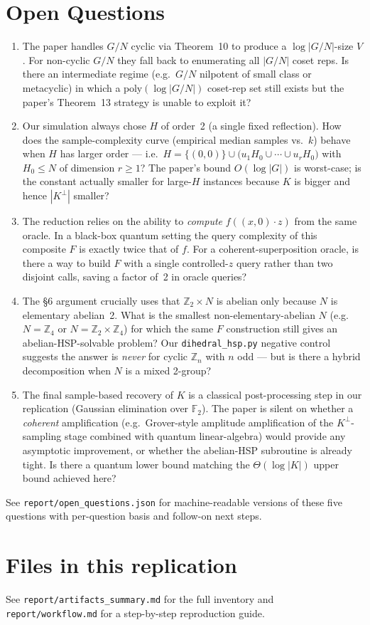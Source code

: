 \documentclass[11pt]{article}
\begin{document}
\section{Open Questions}
\begin{enumerate}
  \item[Q1.] The paper handles $G/N$ cyclic via Theorem~10 to
        produce a $\log|G/N|$-size $V$.  For non-cyclic $G/N$ they
        fall back to enumerating all $|G/N|$ coset reps.  Is there
        an intermediate regime (e.g.\ $G/N$ nilpotent of small class
        or metacyclic) in which a $\mathrm{poly}(\log|G/N|)$
        coset-rep set still exists but the paper's Theorem~13
        strategy is unable to exploit it?
  \item[Q2.] Our simulation always chose $H$ of order~2 (a single fixed
        reflection).  How does the sample-complexity curve
        (empirical median samples vs.\ $k$) behave when $H$ has larger
        order — i.e.\ $H=\{(0,0)\}\cup\bigl(u_1H_0\cup\cdots\cup u_r H_0\bigr)$
        with $H_0\le N$ of dimension $r\ge 1$?  The paper's bound
        $O(\log|G|)$ is worst-case; is the constant actually smaller
        for large-$H$ instances because $K$ is bigger and hence
        $|K^\perp|$ smaller?
  \item[Q3.] The reduction relies on the ability to \emph{compute}
        $f((x,0)\cdot z)$ from the same oracle. In a black-box quantum
        setting the query complexity of this composite $F$ is exactly
        twice that of $f$.  For a coherent-superposition oracle, is
        there a way to build $F$ with a single controlled-$z$ query
        rather than two disjoint calls, saving a factor of~2 in
        oracle queries?
  \item[Q4.] The \S6 argument crucially uses that $\mathbb{Z}_2\times N$
        is abelian only because $N$ is elementary abelian~2.  What is the
        smallest non-elementary-abelian $N$ (e.g.\ $N=\mathbb{Z}_4$ or
        $N=\mathbb{Z}_2\times\mathbb{Z}_4$) for which the same $F$
        construction still gives an abelian-HSP-solvable problem?  Our
        \verb|dihedral_hsp.py| negative control suggests the answer is
        \emph{never} for cyclic $\mathbb{Z}_n$ with $n$ odd — but is there
        a hybrid decomposition when $N$ is a mixed 2-group?
  \item[Q5.] The final sample-based recovery of $K$ is a classical
        post-processing step in our replication (Gaussian elimination
        over $\mathbb{F}_2$).  The paper is silent on whether a
        \emph{coherent} amplification (e.g.\ Grover-style amplitude
        amplification of the $K^\perp$-sampling stage combined with
        quantum linear-algebra) would provide any asymptotic improvement,
        or whether the abelian-HSP subroutine is already tight.
        Is there a quantum lower bound
        matching the $\Theta(\log|K|)$ upper bound achieved here?
\end{enumerate}
See \verb|report/open_questions.json| for machine-readable versions of
these five questions with per-question basis and follow-on next steps.

\section{Files in this replication}
See \verb|report/artifacts_summary.md| for the full inventory and
\verb|report/workflow.md| for a step-by-step reproduction guide.
\end{document}
